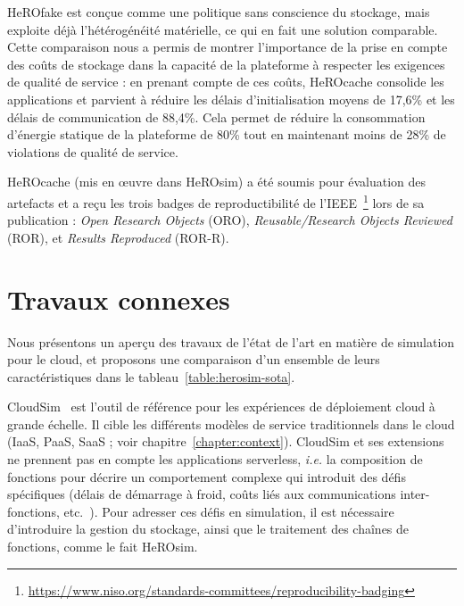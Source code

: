 HeROfake est conçue comme une politique sans conscience du stockage, mais exploite déjà l'hétérogénéité matérielle, ce qui en fait une solution comparable. Cette comparaison nous a permis de montrer l'importance de la prise en compte des coûts de stockage dans la capacité de la plateforme à respecter les exigences de qualité de service : en prenant compte de ces coûts, HeROcache consolide les applications et parvient à réduire les délais d'initialisation moyens de 17,6\% et les délais de communication de 88,4\%. Cela permet de réduire la consommation d'énergie statique de la plateforme de 80\% tout en maintenant moins de 28\% de violations de qualité de service.

HeROcache (mis en œuvre dans HeROsim) a été soumis pour évaluation des artefacts et a reçu les trois badges de reproductibilité de l'IEEE~\footnote{\href{https://www.niso.org/standards-committees/reproducibility-badging}{https://www.niso.org/standards-committees/reproducibility-badging}} lors de sa publication : \textit{Open Research Objects} (ORO), \textit{Reusable/Research Objects Reviewed} (ROR), et \textit{Results Reproduced} (ROR-R).

\section{Travaux connexes}
\label{section:herosim-sota}

Nous présentons un aperçu des travaux de l'état de l'art en matière de simulation pour le cloud, et proposons une comparaison d'un ensemble de leurs caractéristiques dans le tableau~\ref{table:herosim-sota}.

CloudSim~\cite{calheiros_cloudsim_2011} est l'outil de référence pour les expériences de déploiement cloud à grande échelle. Il cible les différents modèles de service traditionnels dans le cloud (\gls{IaaS}, \gls{PaaS}, \gls{SaaS} ; voir chapitre~\ref{chapter:context}).
CloudSim et ses extensions~\cite{calheiros_cloudsim_2011, mampage_cloudsimsc_2023, wickremasinghe_cloudanalyst_2010, jeonCloudSimExtensionSimulatingDistributed2019} ne prennent pas en compte les applications serverless, \textit{i.e.} la composition de fonctions pour décrire un comportement complexe qui introduit des défis spécifiques (délais de démarrage à froid, coûts liés aux communications inter-fonctions, etc.~\cite{wawrzoniakBoxerDataAnalytics2021a}).
Pour adresser ces défis en simulation, il est nécessaire d'introduire la gestion du stockage, ainsi que le traitement des chaînes de fonctions, comme le fait HeROsim.


